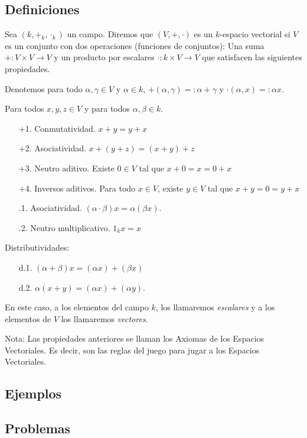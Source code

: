 \subsection*{Definiciones}
Sea \( (k, +_k, \cdot_k) \) un campo. Diremos que \( (V, +, \cdot) \) es un \( k \)-espacio vectorial si \( V \) es un conjunto con dos operaciones (funciones de conjuntos):
Una suma \( + : V \times V \rightarrow V \) y un producto por escalares \( \cdot : k \times V \rightarrow V \) que satisfacen las siguientes propiedades.

Denotemos para todo \( \alpha, \gamma \in V \) y \( \alpha \in k \), \( +(\alpha, \gamma) =: \alpha + \gamma \) y \( \cdot(\alpha, x) =: \alpha x \).

Para todos \( x, y, z \in V \) y para todos \( \alpha, \beta \in k \).
\begin{itemize}
    \item[+1.] Conmutatividad. \( x + y = y + x \)
    \item[+2.] Asociatividad. \( x + (y + z) = (x + y) + z \)
    \item[+3.] Neutro aditivo. Existe \( 0 \in V \) tal que \( x + 0 = x = 0 + x \)
    \item[+4.] Inversos aditivos. Para todo \( x \in V \), existe \( y \in V \) tal que \( x + y = 0 = y + x \)
\end{itemize}

\begin{itemize}
    \item[.1.] Asociatividad. \( (\alpha \cdot \beta)x = \alpha(\beta x) \).
    \item[.2.] Neutro multiplicativo. \( 1_k x = x \)
\end{itemize}

Distributividades:
\begin{itemize}
    \item[d.1.] \( (\alpha + \beta)x = (\alpha x) + (\beta x) \)
    \item[d.2.] \( \alpha(x + y) = (\alpha x) + (\alpha y) \).
\end{itemize}

En este caso, a los elementos del campo \( k \), los llamaremos \textit{escalares} y a los elementos de \( V \) los llamaremos \textit{vectores}.

Nota: Las propiedades anteriores se llaman los Axiomas de los Espacios Vectoriales. Es decir, son las reglas del juego para jugar a los Espacios Vectoriales.

\subsection*{Ejemplos}

\subsection*{Problemas}